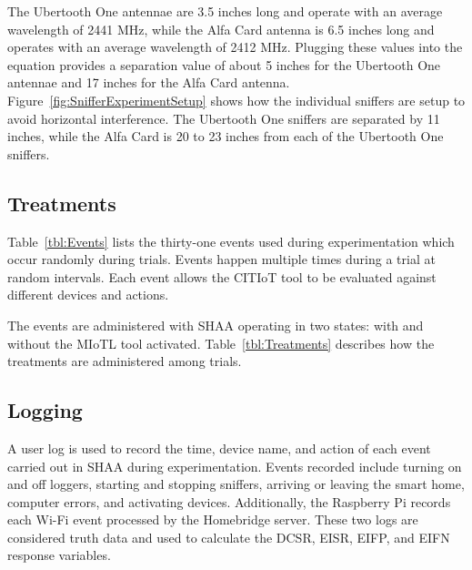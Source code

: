 \documentclass[12pt,letterpaper,oneside]{book}
\begin{document}
			The Ubertooth One antennae are 3.5 inches long and operate with an average wavelength of 2441 MHz, while the Alfa Card antenna is 6.5 inches long and operates with an average wavelength of 2412 MHz. Plugging these values into the equation provides a separation value of about 5 inches for the Ubertooth One antennae and 17 inches for the Alfa Card antenna. Figure~\ref{fig:SnifferExperimentSetup} shows how the individual sniffers are setup to avoid horizontal interference. The Ubertooth One sniffers are separated by 11 inches, while the Alfa Card is 20 to 23 inches from each of the Ubertooth One sniffers.
			
			\figSnifferExperimentSetup
			
			\subsection{Treatments} \label{treatments}
			Table~\ref{tbl:Events} lists the thirty-one events used during experimentation which occur randomly during trials. Events happen multiple times during a trial at random intervals. Each event allows the \ac{CITIoT} tool to be evaluated against different devices and actions.
			
			\tableEvents
			
			The events are administered with \ac{SHAA} operating in two states: with and without the \ac{MIoTL} tool activated. Table~\ref{tbl:Treatments} describes how the treatments are administered among trials.
			
			\tableTreatments
			
			\subsection{Logging}
			A user log is used to record the time, device name, and action of each event carried out in \ac{SHAA} during experimentation. Events recorded include turning on and off loggers, starting and stopping sniffers, arriving or leaving the smart home, computer errors, and activating devices. Additionally, the Raspberry Pi records each Wi-Fi event processed by the Homebridge server. These two logs are considered truth data and used to calculate the \ac{DCSR}, \ac{EISR}, \ac{EIFP}, and \ac{EIFN} response variables.
			
\end{document}
